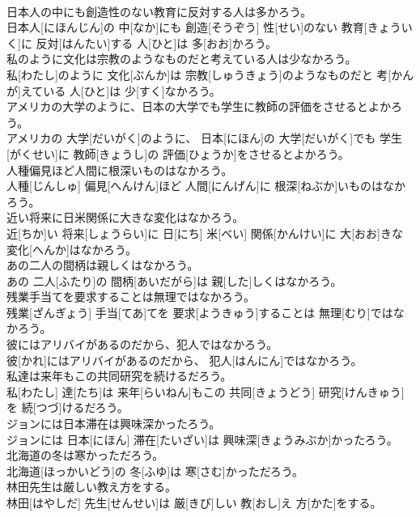 \documentclass[8pt]{extreport}
\begin{document}
\begin{CJK}{UTF8}{min}
\\	日本人の中にも創造性のない教育に反対する人は多かろう。	
\\	日本人[にほんじん]の 中[なか]にも 創造[そうぞう] 性[せい]のない 教育[きょういく]に 反対[はんたい]する 人[ひと]は 多[おお]かろう。
\\	私のように文化は宗教のようなものだと考えている人は少なかろう。	
\\	私[わたし]のように 文化[ぶんか]は 宗教[しゅうきょう]のようなものだと 考[かんが]えている 人[ひと]は 少[すく]なかろう。
\\	アメリカの大学のように、日本の大学でも学生に教師の評価をさせるとよかろう。	
\\	アメリカの 大学[だいがく]のように、 日本[にほん]の 大学[だいがく]でも 学生[がくせい]に 教師[きょうし]の 評価[ひょうか]をさせるとよかろう。
\\	人種偏見ほど人間に根深いものはなかろう。	
\\	人種[じんしゅ] 偏見[へんけん]ほど 人間[にんげん]に 根深[ねぶか]いものはなかろう。
\\	近い将来に日米関係に大きな変化はなかろう。	
\\	近[ちか]い 将来[しょうらい]に 日[にち] 米[べい] 関係[かんけい]に 大[おお]きな 変化[へんか]はなかろう。
\\	あの二人の間柄は親しくはなかろう。	
\\	あの 二人[ふたり]の 間柄[あいだがら]は 親[した]しくはなかろう。
\\	残業手当てを要求することは無理ではなかろう。	
\\	残業[ざんぎょう] 手当[てあ]てを 要求[ようきゅう]することは 無理[むり]ではなかろう。
\\	彼にはアリバイがあるのだから、犯人ではなかろう。	
\\	彼[かれ]にはアリバイがあるのだから、 犯人[はんにん]ではなかろう。
\\	私達は来年もこの共同研究を続けるだろう。	
\\	私[わたし] 達[たち]は 来年[らいねん]もこの 共同[きょうどう] 研究[けんきゅう]を 続[つづ]けるだろう。
\\	ジョンには日本滞在は興味深かったろう。	
\\	ジョンには 日本[にほん] 滞在[たいざい]は 興味深[きょうみぶか]かったろう。
\\	北海道の冬は寒かっただろう。	
\\	北海道[ほっかいどう]の 冬[ふゆ]は 寒[さむ]かっただろう。
\\	林田先生は厳しい教え方をする。	
\\	林田[はやしだ] 先生[せんせい]は 厳[きび]しい 教[おし]え 方[かた]をする。

\end{CJK}
\end{document}
